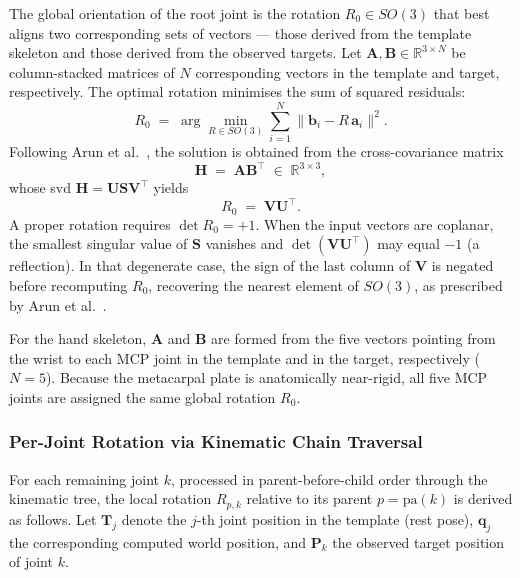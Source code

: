 The global orientation of the root joint is the rotation $R_0 \in SO(3)$ that
best aligns two corresponding sets of vectors --- those derived from the
template skeleton and those derived from the observed targets.
Let $\mathbf{A}, \mathbf{B} \in \mathbb{R}^{3 \times N}$ be column-stacked
matrices of $N$ corresponding vectors in the template and target,
respectively. The optimal rotation minimises the sum of squared residuals:
\begin{equation}
  R_0 \;=\; \arg\min_{R \in SO(3)}
  \sum_{i=1}^{N} \bigl\|\mathbf{b}_i - R\,\mathbf{a}_i\bigr\|^2.
\end{equation}
Following Arun et al.\ \cite{arun1987leastsquares}, the solution is obtained
from the cross-covariance matrix
\begin{equation}\label{eq:H}
  \mathbf{H} \;=\; \mathbf{A}\mathbf{B}^{\top} \;\in\; \mathbb{R}^{3 \times 3},
\end{equation}
whose \acrshort{svd} $\mathbf{H} = \mathbf{U}\mathbf{S}\mathbf{V}^{\top}$
yields
\begin{equation}\label{eq:R0}
  R_0 \;=\; \mathbf{V}\mathbf{U}^{\top}.
\end{equation}
A proper rotation requires $\det R_0 = +1$. When the input vectors are
coplanar, the smallest singular value of $\mathbf{S}$ vanishes and
$\det(\mathbf{V}\mathbf{U}^{\top})$ may equal $-1$ (a reflection). In that
degenerate case, the sign of the last column of $\mathbf{V}$ is negated before
recomputing $R_0$, recovering the nearest element of $SO(3)$, as prescribed by
Arun et al.\ \cite{arun1987leastsquares}.

For the hand skeleton, $\mathbf{A}$ and $\mathbf{B}$ are formed from the five
vectors pointing from the wrist to each MCP joint in the
template and in the target, respectively ($N = 5$). Because the metacarpal
plate is anatomically near-rigid, all five MCP joints are assigned the same
global rotation $R_0$.

\subsubsection{Per-Joint Rotation via Kinematic Chain Traversal}

For each remaining joint $k$, processed in parent-before-child order through
the kinematic tree, the local rotation $R_{p,k}$ relative to its parent $p =
\mathrm{pa}(k)$ is derived as follows. Let $\mathbf{T}_j$ denote the $j$-th
joint position in the template (rest pose), $\mathbf{q}_j$ the corresponding
computed world position, and $\mathbf{P}_k$ the observed target position of
joint $k$.


